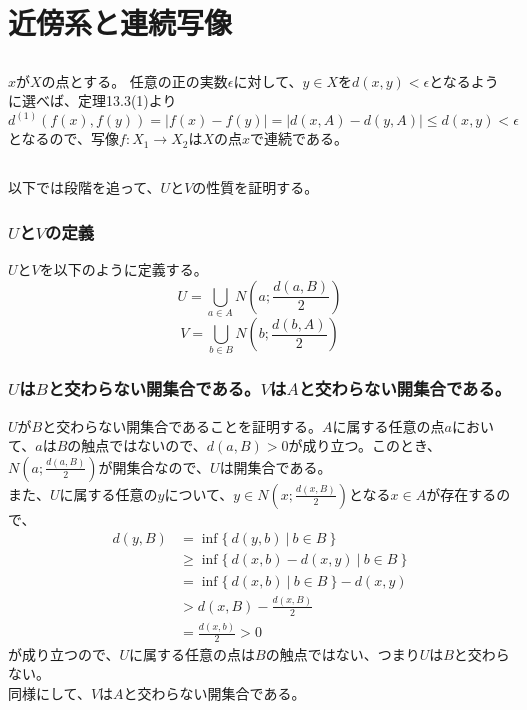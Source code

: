\documentclass{jsarticle}
\begin{document}
\section{近傍系と連続写像}
\subsection{}
$x$が$X$の点とする。
任意の正の実数$\epsilon$に対して、$y\in X$を$d(x,y)<\epsilon$となるように選べば、定理13.3(1)より
\[d^{(1)}(f(x),f(y))=|f(x)-f(y)|=|d(x,A)-d(y,A)|\leq d(x,y) <\epsilon\]
となるので、写像$f:X_1\to X_2$は$X$の点$x$で連続である。


\subsection{}
以下では段階を追って、$U$と$V$の性質を証明する。
\subsubsection{$U$と$V$の定義}
$U$と$V$を以下のように定義する。
\[U=\bigcup_{a\in A}N(a;\frac{d(a,B)}{2})\]
\[V=\bigcup_{b\in B}N(b;\frac{d(b,A)}{2})\]
\subsubsection{$U$は$B$と交わらない開集合である。$V$は$A$と交わらない開集合である。}
$U$が$B$と交わらない開集合であることを証明する。$A$に属する任意の点$a$において、$a$は$B$の触点ではないので、$d(a,B)>0$が成り立つ。このとき、$N(a;\frac{d(a,B)}{2})$が開集合なので、$U$は開集合である。\\
また、$U$に属する任意の$y$について、$y\in N(x;\frac{d(x,B)}{2})$となる$x\in A$が存在するので、
\begin{align*}
d(y,B)&=\inf\{\ d(y,b)\ |\ b\in B\ \}\\
&\geq\inf\{\ d(x,b)-d(x,y)\ |\ b\in B\ \}\\
&=\inf\{\ d(x,b)\ |\ b\in B\ \}-d(x,y)\\
&> d(x,B)-\frac{d(x,B)}{2}\\
&=\frac{d(x,b)}{2}>0
\end{align*}
が成り立つので、$U$に属する任意の点は$B$の触点ではない、つまり$U$は$B$と交わらない。\\
同様にして、$V$は$A$と交わらない開集合である。
\end{document}
